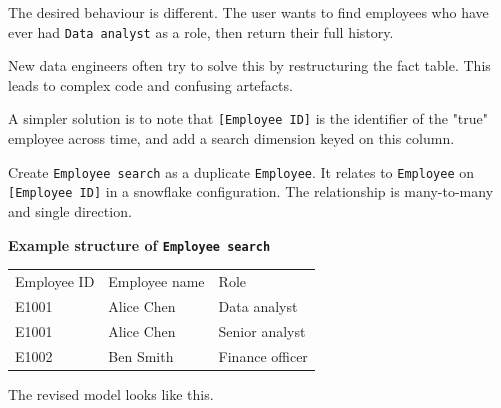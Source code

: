 \documentclass[10pt,openany,10pt]{book}
\newcounter{none}
\let\podeToprule\toprule
\let\podeMidrule\midrule
\let\podeBottomrule\bottomrule
\renewcommand{\toprule}{\arrayrulecolor{pbiGrid}\podeToprule}
\renewcommand{\midrule}{\arrayrulecolor{pbiGrid}\podeMidrule}
\renewcommand{\bottomrule}{\arrayrulecolor{pbiGrid}\podeBottomrule}
\begin{document}
The desired behaviour is different. The user wants to find employees who
have ever had \texttt{Data\ analyst} as a role, then return their full
history.

New data engineers often try to solve this by restructuring the fact
table. This leads to complex code and confusing artefacts.

A simpler solution is to note that \texttt{{[}Employee\ ID{]}} is the
identifier of the "true" employee across time, and add a search
dimension keyed on this column.

Create \texttt{\textquotesingle{}Employee\ search\textquotesingle{}} as
a duplicate \texttt{\textquotesingle{}Employee\textquotesingle{}}. It
relates to \texttt{\textquotesingle{}Employee\textquotesingle{}} on
\texttt{{[}Employee\ ID{]}} in a snowflake configuration. The
relationship is many-to-many and single direction.

\textbf{Example structure of
\texttt{\textquotesingle{}Employee\ search\textquotesingle{}}}

{\def\LTcaptype{none} %
\begin{longtable}[]{@{}lll@{}}
\toprule\noalign{}
Employee ID & Employee name & Role \\
\midrule\noalign{}
\endhead
\bottomrule\noalign{}
\endlastfoot
E1001 & Alice Chen & Data analyst \\
E1001 & Alice Chen & Senior analyst \\
E1002 & Ben Smith & Finance officer \\
\end{longtable}
}

The revised model looks like this.
\end{document}
